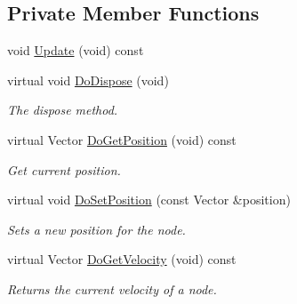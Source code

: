 \subsection*{Private Member Functions}
\begin{DoxyCompactItemize}
\item 
void \hyperlink{classns3_1_1WaypointMobilityModel_a243a8be0ea162ae1edfeb4214c5be719}{Update} (void) const 
\item 
virtual void \hyperlink{classns3_1_1WaypointMobilityModel_a78e6ef8538d991e5033f04692f419a03}{Do\+Dispose} (void)
\begin{DoxyCompactList}\small\item\em The dispose method. \end{DoxyCompactList}\item 
virtual Vector \hyperlink{classns3_1_1WaypointMobilityModel_acb92001faaa128357cdc8fa366ec3413}{Do\+Get\+Position} (void) const 
\begin{DoxyCompactList}\small\item\em Get current position. \end{DoxyCompactList}\item 
virtual void \hyperlink{classns3_1_1WaypointMobilityModel_a4b3b27288c05519dd3b8e9cfccffdfc8}{Do\+Set\+Position} (const Vector \&position)
\begin{DoxyCompactList}\small\item\em Sets a new position for the node. \end{DoxyCompactList}\item 
virtual Vector \hyperlink{classns3_1_1WaypointMobilityModel_a62b1c6d47ca349f6a3e204e2e2232974}{Do\+Get\+Velocity} (void) const 
\begin{DoxyCompactList}\small\item\em Returns the current velocity of a node. \end{DoxyCompactList}\end{DoxyCompactItemize}
